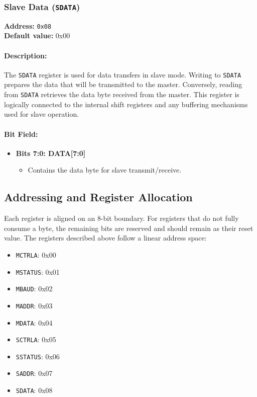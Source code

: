 \vspace{2mm}

\subsubsection{Slave Data (\texttt{SDATA})}
\label{sec:sdata}

\textbf{Address:} \texttt{0x08} \\
\textbf{Default value:} 0x00

\paragraph{Description:}  
The \texttt{SDATA} register is used for data transfers in slave mode. Writing to \texttt{SDATA} prepares the data that will
be transmitted to the master. Conversely, reading from \texttt{SDATA} retrieves the data byte received from the master.
This register is logically connected to the internal shift registers and any buffering mechanisms used for slave
operation.

\paragraph{Bit Field:}
\begin{itemize}[leftmargin=*,itemsep=2mm]
  \item \textbf{Bits 7:0: DATA[7:0]}  
        \begin{itemize}
          \item Contains the data byte for slave transmit/receive.
        \end{itemize}
\end{itemize}

\vspace{2mm}

\subsection{Addressing and Register Allocation}

Each register is aligned on an 8-bit boundary. For registers that do not fully consume a byte, the remaining bits are
reserved and should remain as their reset value. The registers described above follow a linear address space:
\begin{itemize}
  \item \texttt{MCTRLA}: 0x00
  \item \texttt{MSTATUS}: 0x01
  \item \texttt{MBAUD}: 0x02
  \item \texttt{MADDR}: 0x03
  \item \texttt{MDATA}: 0x04
  \item \texttt{SCTRLA}: 0x05
  \item \texttt{SSTATUS}: 0x06
  \item \texttt{SADDR}: 0x07
  \item \texttt{SDATA}: 0x08
\end{itemize}

